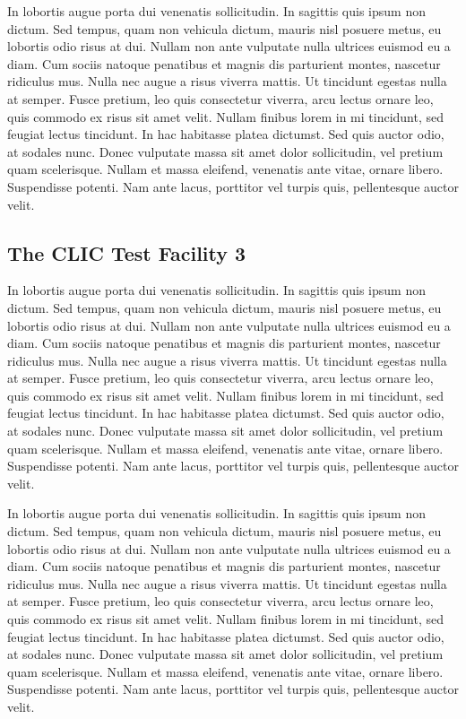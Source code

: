 In lobortis augue porta dui venenatis sollicitudin. In sagittis quis ipsum non dictum. Sed tempus, quam non vehicula dictum, mauris nisl posuere metus, eu lobortis odio risus at dui. Nullam non ante vulputate nulla ultrices euismod eu a diam. Cum sociis natoque penatibus et magnis dis parturient montes, nascetur ridiculus mus. Nulla nec augue a risus viverra mattis. Ut tincidunt egestas nulla at semper. Fusce pretium, leo quis consectetur viverra, arcu lectus ornare leo, quis commodo ex risus sit amet velit. Nullam finibus lorem in mi tincidunt, sed feugiat lectus tincidunt. In hac habitasse platea dictumst. Sed quis auctor odio, at sodales nunc. Donec vulputate massa sit amet dolor sollicitudin, vel pretium quam scelerisque. Nullam et massa eleifend, venenatis ante vitae, ornare libero. Suspendisse potenti. Nam ante lacus, porttitor vel turpis quis, pellentesque auctor velit.



\subsection[CTF3]{The CLIC Test Facility 3}

In lobortis augue porta dui venenatis sollicitudin. In sagittis quis ipsum non dictum. Sed tempus, quam non vehicula dictum, mauris nisl posuere metus, eu lobortis odio risus at dui. Nullam non ante vulputate nulla ultrices euismod eu a diam. Cum sociis natoque penatibus et magnis dis parturient montes, nascetur ridiculus mus. Nulla nec augue a risus viverra mattis. Ut tincidunt egestas nulla at semper. Fusce pretium, leo quis consectetur viverra, arcu lectus ornare leo, quis commodo ex risus sit amet velit. Nullam finibus lorem in mi tincidunt, sed feugiat lectus tincidunt. In hac habitasse platea dictumst. Sed quis auctor odio, at sodales nunc. Donec vulputate massa sit amet dolor sollicitudin, vel pretium quam scelerisque. Nullam et massa eleifend, venenatis ante vitae, ornare libero. Suspendisse potenti. Nam ante lacus, porttitor vel turpis quis, pellentesque auctor velit.

In lobortis augue porta dui venenatis sollicitudin. In sagittis quis ipsum non dictum. Sed tempus, quam non vehicula dictum, mauris nisl posuere metus, eu lobortis odio risus at dui. Nullam non ante vulputate nulla ultrices euismod eu a diam. Cum sociis natoque penatibus et magnis dis parturient montes, nascetur ridiculus mus. Nulla nec augue a risus viverra mattis. Ut tincidunt egestas nulla at semper. Fusce pretium, leo quis consectetur viverra, arcu lectus ornare leo, quis commodo ex risus sit amet velit. Nullam finibus lorem in mi tincidunt, sed feugiat lectus tincidunt. In hac habitasse platea dictumst. Sed quis auctor odio, at sodales nunc. Donec vulputate massa sit amet dolor sollicitudin, vel pretium quam scelerisque. Nullam et massa eleifend, venenatis ante vitae, ornare libero. Suspendisse potenti. Nam ante lacus, porttitor vel turpis quis, pellentesque auctor velit.
